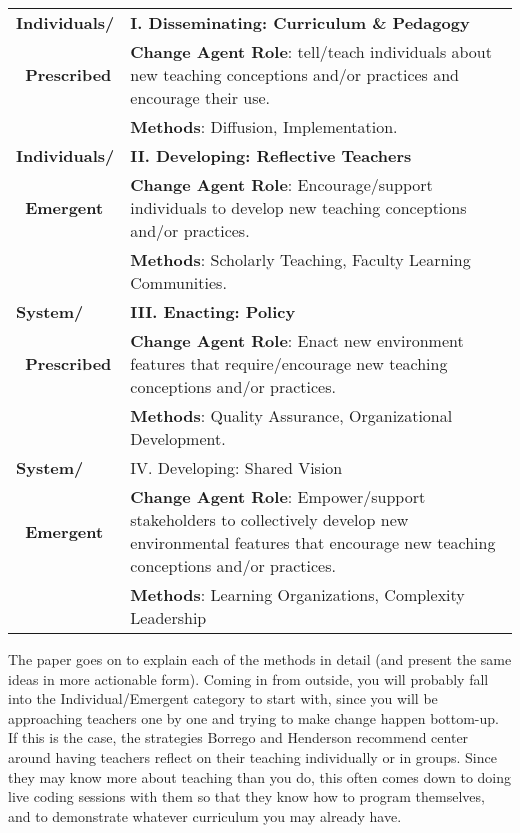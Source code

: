 {\small
\begin{longtable}{p{}p{}}

  \textbf{Individuals/}
  & \textbf{I. Disseminating: Curriculum \& Pedagogy}
  \\

  \textbf{~Prescribed}
  & \textbf{Change Agent Role}:
    tell/teach individuals about new teaching conceptions and/or
    practices and encourage their use.
  \\

  ~
  & \textbf{Methods}: Diffusion, Implementation.
  \\

  \textbf{Individuals/}
  & \textbf{II. Developing: Reflective Teachers}
  \\

  \textbf{~Emergent}
  & \textbf{Change Agent Role}:
    Encourage/support individuals to develop new teaching conceptions
    and/or practices.
  \\

  ~
  & \textbf{Methods}: Scholarly Teaching, Faculty Learning Communities.
  \\

  \textbf{System/}
  & \textbf{III. Enacting: Policy}
  \\

  \textbf{~Prescribed}
  & \textbf{Change Agent Role}:
    Enact new environment features that require/encourage new teaching
    conceptions and/or practices.
  \\

  ~
  & \textbf{Methods}: Quality Assurance, Organizational Development.
  \\

  \textbf{System/}
  & IV. Developing: Shared Vision
  \\

  \textbf{~Emergent}
  & \textbf{Change Agent Role}:
    Empower/support stakeholders to collectively develop new
    environmental features that encourage new teaching conceptions
    and/or practices.
  \\

  ~
  & \textbf{Methods}: Learning Organizations, Complexity Leadership
  \\
\end{longtable}
}

\noindent
The paper goes on to explain each of the methods in detail (and
\cite{Hend2015a,Hend2015b} present the same ideas in more actionable
form).  Coming in from outside, you will probably fall into the
Individual/Emergent category to start with, since you will be
approaching teachers one by one and trying to make change happen
bottom-up.  If this is the case, the strategies Borrego and Henderson
recommend center around having teachers reflect on their teaching
individually or in groups.  Since they may know more about teaching
than you do, this often comes down to doing live coding sessions with
them so that they know how to program themselves, and to demonstrate
whatever curriculum you may already have.

